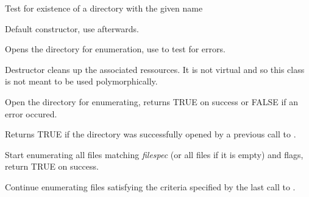 
Test for existence of a directory with the given name

\label{wxdirwxdir}


Default constructor, use  afterwards.


Opens the directory for enumeration, use  
to test for errors.

\label{wxdirdtor}


Destructor cleans up the associated ressources. It is not virtual and so this
class is not meant to be used polymorphically.

\label{wxdiropen}


Open the directory for enumerating, returns TRUE on success or FALSE if an
error occured.

\label{wxdirisopened}


Returns TRUE if the directory was successfully opened by a previous call to 
.

\label{wxdirgetfirst}


Start enumerating all files matching {\it filespec} (or all files if it is
empty) and flags, return TRUE on success.

\label{wxdirgetnext}


Continue enumerating files satisfying the criteria specified by the last call
to .

